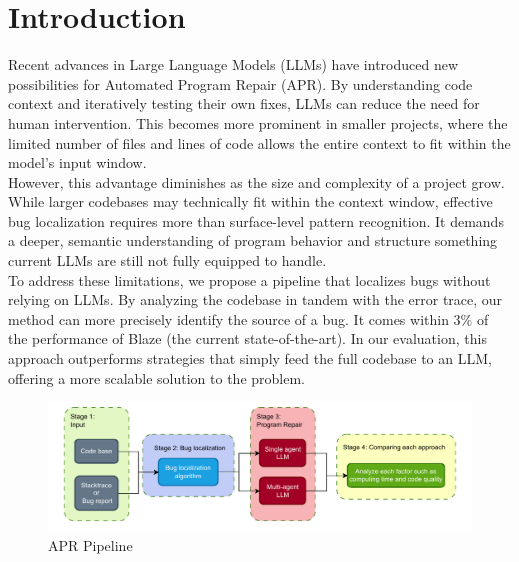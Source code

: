 \section{Introduction}
Recent advances in Large Language Models (LLMs) have introduced new possibilities for Automated Program Repair (APR). By understanding code context and iteratively testing their own fixes, LLMs can reduce the need for human intervention. This becomes more prominent in smaller projects, where the limited number of files and lines of code allows the entire context to fit within the model's input window.\\
However, this advantage diminishes as the size and complexity of a project grow. While larger codebases may technically fit within the context window, effective bug localization requires more than surface-level pattern recognition. It demands a deeper, semantic understanding of program behavior and structure something current LLMs are still not fully equipped to handle.\\
To address these limitations, we propose a pipeline that localizes bugs without relying on LLMs. By analyzing the codebase in tandem with the error trace, our method can more precisely identify the source of a bug. It comes within 3\% of the performance of Blaze (the current state-of-the-art). 
In our evaluation, this approach outperforms strategies that simply feed the full codebase to an LLM, offering a more scalable solution to the problem.

\begin{figure}[H]
\centering
\includegraphics[width=1\columnwidth]{Figures/OverallView.pdf}
\caption{APR Pipeline}
\label{fig:apr_pipeline}
\end{figure}

